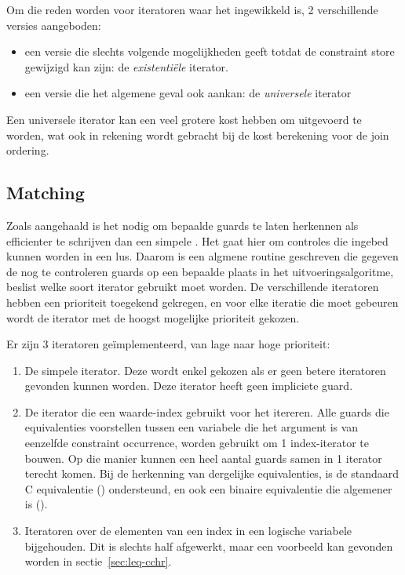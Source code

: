 Om die reden worden voor iteratoren waar het ingewikkeld is, 2 verschillende versies aangeboden: \begin{itemize}
\item een versie die slechts volgende mogelijkheden geeft totdat de constraint store gewijzigd kan zijn: de {\em existenti\"ele} iterator.
\item een versie die het algemene geval ook aankan: de {\em universele} iterator
\end{itemize}

Een universele iterator kan een veel grotere kost hebben om uitgevoerd te worden, wat ook in rekening wordt gebracht bij de kost berekening voor de join ordering.

\subsection{Matching} \label{sec:matching}

Zoals aangehaald is het nodig om bepaalde guards te laten herkennen als efficienter te schrijven dan een simpele . Het gaat hier om controles die ingebed kunnen worden in een lus. Daarom is een algmene routine geschreven die gegeven de nog te controleren guards op een bepaalde plaats in het uitvoeringsalgoritme, beslist welke soort iterator gebruikt moet worden. De verschillende iteratoren hebben een prioriteit toegekend gekregen, en voor elke iteratie die moet gebeuren wordt de iterator met de hoogst mogelijke prioriteit gekozen.

Er zijn 3 iteratoren ge\"implementeerd, van lage naar hoge prioriteit: \begin{enumerate}
\item De simpele  iterator. Deze wordt enkel gekozen als er geen betere iteratoren gevonden kunnen worden. Deze iterator heeft geen impliciete guard.
\item De  iterator die een waarde-index gebruikt voor het itereren. Alle guards die equivalenties voorstellen tussen een variabele die het argument is van eenzelfde constraint occurrence, worden gebruikt om 1 index-iterator te bouwen. Op die manier kunnen een heel aantal guards samen in 1 iterator terecht komen. Bij de herkenning van dergelijke equivalenties, is de standaard C equivalentie (\code{==}) ondersteund, en ook een binaire equivalentie die algemener is ().
\item Iteratoren over de elementen van een index in een logische variabele bijgehouden. Dit is slechts half afgewerkt, maar een voorbeeld kan gevonden worden in sectie~\ref{sec:leq-cchr}.
\end{enumerate}

